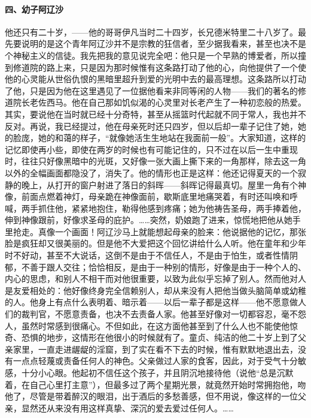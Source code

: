 \paragraph*{四、幼子阿辽沙}
\par 他还只有二十岁，——他的哥哥伊凡当时二十四岁，长兄德米特里二十八岁了。最先要说明的是这个青年阿辽沙并不是宗教的狂信者，至少据我看来，甚至也决不是个神秘主义的信徒。我先把我的意见说完全吧：他只是一个早熟的博爱者，所以撞到修道院的路上来，只是因为那时候惟有这条路打动了他的心，向他提供了一个使他的心灵能从世俗仇恨的黑暗里超升到爱的光明中去的最高理想。这条路所以打动了他，只是因为他在这里遇见了一位据他看来非同等闲的人物——我们的著名的修道院长老佐西马。他在自己那如饥似渴的心灵里对长老产生了一种初恋般的热爱。其实，要说他在当时就已经十分奇特，甚至从摇篮时代起就不同于常人，我也并不反对。再说，我已经提过，他在母亲死时还只四岁，但以后却一辈子记住了她，她的脸庞，她的和蔼的样子，“就像她活生生地站在我面前一般”。大家知道，这样的记忆即使再小些，即使在两岁的时候也有可能记住的，只不过在以后一生中重现时，往往只好像黑暗中的光斑，又好像一张大画上撕下来的一角那样，除去这一角以外的全幅画面都隐没了，消失了。他的情形也正是这样：他还记得夏天的一个寂静的晚上，从打开的窗户射进了落日的斜晖——斜晖记得最真切。屋里一角有个神像，前面点燃着神灯，母亲跪在神像面前，歇斯底里地痛哭着，有时还叫唤和呼喊，两手抓住他，紧紧地抱住，勒得他感到疼痛；她为他祷告圣母，两手捧着他，伸到神像跟前，好像求圣母的庇护。……突然，奶娘跑了进来，惊慌地把他从她手里抢走。真像一个画面！阿辽沙马上就能想起母亲的脸来：他说据他的记忆，那张脸是疯狂却又很美丽的。但是他不大爱把这个回忆讲给什么人听。他在童年和少年时不好动，甚至不大说话，这倒不是由于不信任人，不是由于怕生，或者性情阴郁，不善于跟人交往；恰恰相反，是由于一种别的情形，好像是由于一种个人的、内心的思虑，和别人不相干而对他很重要，以致为此似乎忘掉了别人。然而他对人是友爱相处的：他好像终身完全信赖别人，却从来没有人把他当做头脑简单或幼稚的人。他身上有点什么表明着、暗示着——以后一辈子都是这样——他不愿意做人们的裁判官，不愿意责备，也决不去责备人家。他甚至好像对一切都容忍，毫不怨人，虽然时常感到很痛心。不但如此，在这方面他甚至到了什么人也不能使他惊奇、恐惧的地步，这情形在他很小的时候就有了。童贞、纯洁的他二十岁上到了父亲家里，一直走进龌龊的淫窟，到了实在看不下去的时候，惟有默默地退出去，没有一点点轻蔑或责备任何人的神色。父亲做过人家的食客，因此，对于受气十分敏感，十分小心眼。他起初不信任这个孩子，并且阴沉地接待他（说他“总是沉默着，在自己心里打主意”），但最多过了两个星期光景，就竟然开始时常拥抱他，吻他了，尽管是带着醉汉的眼泪，出于酒后的多愁善感，但不用说，像这样的一位父亲，显然还从来没有用这样真挚、深沉的爱去爱过任何人。……
